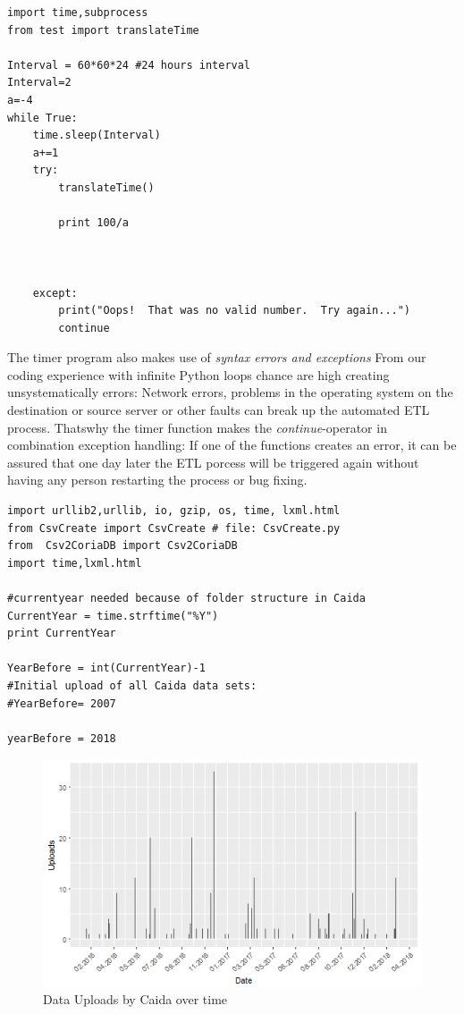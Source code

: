 \documentclass[conference, 11pt]{IEEEtran}
\begin{document}
\begin{lstlisting}
import time,subprocess
from test import translateTime

Interval = 60*60*24 #24 hours interval
Interval=2
a=-4
while True:
	time.sleep(Interval)
	a+=1
	try:
		translateTime()

		print 100/a
		


	except:
		print("Oops!  That was no valid number.  Try again...")
		continue
\end{lstlisting}

The timer program also makes use of \textit{syntax errors and exceptions} %
From our coding experience with infinite Python loops chance are high creating unsystematically errors: Network errors, problems in the operating system on the destination or source server or other faults can break up the automated ETL process.
Thatswhy the timer function makes the \textit{continue}-operator in combination exception handling: If one of the functions creates an error, it can be assured that one day later the ETL porcess will be triggered again without having any person restarting the process or bug fixing.
\linebreak
\linebreak
\linebreak

\begin{lstlisting}
import urllib2,urllib, io, gzip, os, time, lxml.html
from CsvCreate import CsvCreate # file: CsvCreate.py
from  Csv2CoriaDB import Csv2CoriaDB
import time,lxml.html

#currentyear needed because of folder structure in Caida
CurrentYear = time.strftime("%Y")
print CurrentYear

YearBefore = int(CurrentYear)-1
#Initial upload of all Caida data sets:
#YearBefore= 2007

yearBefore = 2018
\end{lstlisting}






\begin{figure}[htbp]
\centerline{\includegraphics[scale=0.5]{Graphics/uploadFrequency.png}}
\caption{Data Uploads by Caida over time}
\label{fig:UploadOverTime}
\end{figure}
\end{document}
